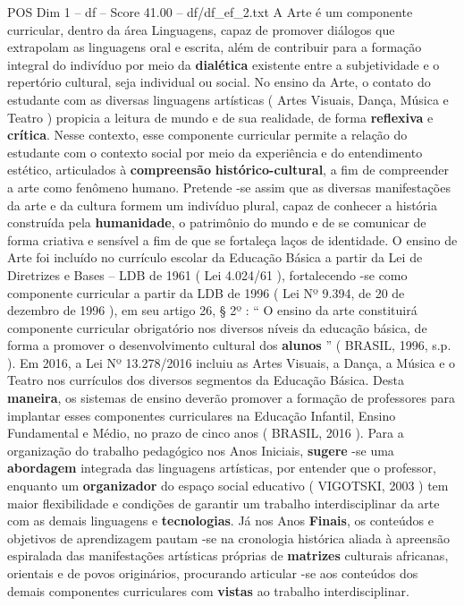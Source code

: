 \begin{textsample}{POS Dim 1 – df – Score 41.00 – df/df\_ef\_2.txt}
A Arte é um componente curricular, dentro da área Linguagens, capaz de promover diálogos que extrapolam as linguagens oral e escrita, além de contribuir para a formação integral do indivíduo por meio da \textbf{dialética} existente entre a subjetividade e o repertório cultural, seja individual ou social.
No ensino da Arte, o contato do estudante com as diversas linguagens artísticas ( Artes Visuais, Dança, Música e Teatro ) propicia a leitura de mundo e de sua realidade, de forma \textbf{reflexiva} e \textbf{crítica}.
Nesse contexto, esse componente curricular permite a relação do estudante com o contexto social por meio da experiência e do entendimento estético, articulados à \textbf{compreensão} \textbf{histórico-cultural}, a fim de compreender a arte como fenômeno humano.
Pretende -se assim que as diversas manifestações da arte e da cultura formem um indivíduo plural, capaz de conhecer a história construída pela \textbf{humanidade}, o patrimônio do mundo e de se comunicar de forma criativa e sensível a fim de que se fortaleça laços de identidade.
O ensino de Arte foi incluído no currículo escolar da Educação Básica a partir da Lei de Diretrizes e Bases – LDB de 1961 ( Lei 4.024/61 ), fortalecendo -se como componente curricular a partir da LDB de 1996 ( Lei Nº 9.394, de 20 de dezembro de 1996 ), em seu artigo 26, § 2º : “ O ensino da arte constituirá componente curricular obrigatório nos diversos níveis da educação básica, de forma a promover o desenvolvimento cultural dos \textbf{alunos} ” ( BRASIL, 1996, s.p. ).
Em 2016, a Lei Nº 13.278/2016 incluiu as Artes Visuais, a Dança, a Música e o Teatro nos currículos dos diversos segmentos da Educação Básica.
Desta \textbf{maneira}, os sistemas de ensino deverão promover a formação de professores para implantar esses componentes curriculares na Educação Infantil, Ensino Fundamental e Médio, no prazo de cinco anos ( BRASIL, 2016 ).
Para a organização do trabalho pedagógico nos Anos Iniciais, \textbf{sugere} -se uma \textbf{abordagem} integrada das linguagens artísticas, por entender que o professor, enquanto um \textbf{organizador} do espaço social educativo ( VIGOTSKI, 2003 ) tem maior flexibilidade e condições de garantir um trabalho interdisciplinar da arte com as demais linguagens e \textbf{tecnologias}.
Já nos Anos \textbf{Finais}, os conteúdos e objetivos de aprendizagem pautam -se na cronologia histórica aliada à apreensão espiralada das manifestações artísticas próprias de \textbf{matrizes} culturais africanas, orientais e de povos originários, procurando articular -se aos conteúdos dos demais componentes curriculares com \textbf{vistas} ao trabalho interdisciplinar.

\end{textsample}
